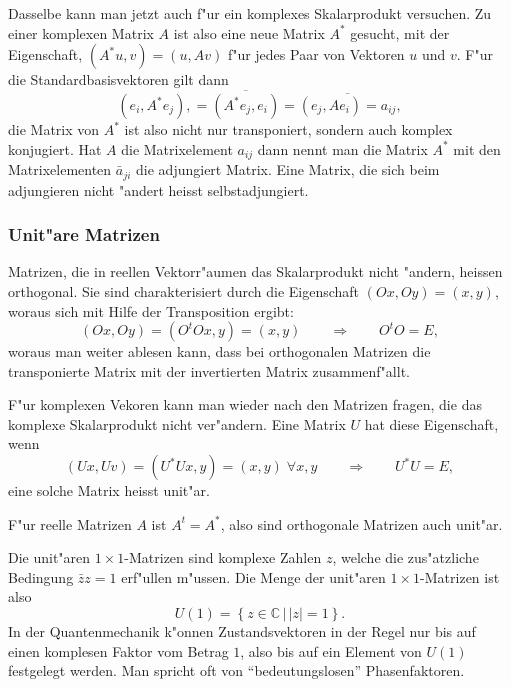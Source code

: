 Dasselbe kann man jetzt auch f"ur ein komplexes Skalarprodukt
versuchen. Zu einer komplexen Matrix $A$ ist also eine neue
Matrix $A^*$ gesucht, mit der Eigenschaft, $(A^*u,v)=(u,Av)$ f"ur 
jedes Paar von Vektoren $u$ und $v$. F"ur die Standardbasisvektoren
gilt dann
\[
(e_i,A^*e_j),
=
\overline{(A^*e_j, e_i)}
=
\overline{(e_j,Ae_i)=a_{ij}},
\]
die Matrix von $A^*$ ist also nicht nur transponiert, sondern auch komplex
konjugiert. Hat $A$ die Matrixelement $a_{ij}$ dann nennt man
die Matrix $A^*$ mit den Matrixelementen $\bar a_{ji}$ die
adjungiert Matrix. Eine Matrix, die sich beim adjungieren nicht
"andert heisst selbstadjungiert.

\subsubsection{Unit"are Matrizen}
Matrizen, die in reellen Vektorr"aumen das Skalarprodukt nicht "andern,
heissen orthogonal. Sie sind charakterisiert durch die Eigenschaft
$(Ox,Oy)=(x,y)$, woraus sich mit Hilfe der Transposition ergibt:
\[
(Ox,Oy)=(O^tOx,y)=(x,y)\qquad\Rightarrow\qquad O^tO=E,
\]
woraus man weiter ablesen kann, dass bei orthogonalen Matrizen
die transponierte Matrix mit der invertierten Matrix zusammenf"allt.

F"ur komplexen Vekoren kann man wieder nach den Matrizen fragen, die das
komplexe Skalarprodukt nicht ver"andern. Eine Matrix $U$ hat diese
Eigenschaft, wenn
\[
(Ux,Uv)=(U^*Ux,y)=(x,y)\;\forall x,y
\qquad\Rightarrow\qquad
U^*U=E,
\]
eine solche Matrix heisst unit"ar. 

F"ur reelle Matrizen $A$ ist $A^t=A^*$, also sind orthogonale Matrizen
auch unit"ar.

\begin{beispiel}
Die unit"aren $1\times 1$-Matrizen sind komplexe Zahlen $z$, welche
die zus"atzliche Bedingung $\bar zz=1$ erf"ullen m"ussen.
Die Menge der unit"aren $1\times 1$-Matrizen ist also
\[
U(1)=\left\{ z\in\mathbb C\,|\, |z|=1
\right\}.
\]
In der Quantenmechanik k"onnen Zustandsvektoren in der Regel nur bis auf
einen komplesen Faktor vom Betrag $1$, also bis auf ein Element
von $U(1)$ festgelegt werden.
Man spricht oft von ``bedeutungslosen'' Phasenfaktoren.
\end{beispiel}

